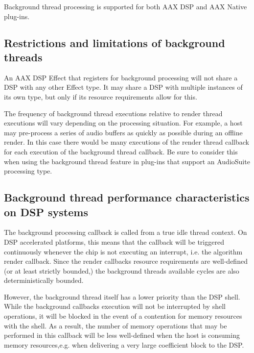 Background thread processing is supported for both A\+AX D\+SP and A\+AX Native plug-\/ins.\hypertarget{a00811_alg_bg_restrict}{}\subsection{Restrictions and limitations of background threads}\label{a00811_alg_bg_restrict}
\begin{DoxyItemize}
\item An A\+AX D\+SP Effect that registers for background processing will not share a D\+SP with any other Effect type. It may share a D\+SP with multiple instances of its own type, but only if its resource requirements allow for this. \item The frequency of background thread executions relative to render thread executions will vary depending on the processing situation. For example, a host may pre-\/process a series of audio buffers as quickly as possible during an offline render. In this case there would be many executions of the render thread callback for each execution of the background thread callback. Be sure to consider this when using the background thread feature in plug-\/ins that support an Audio\+Suite processing type.\end{DoxyItemize}
\hypertarget{a00811_alg_bg_perf}{}\subsection{Background thread performance characteristics on D\+S\+P systems}\label{a00811_alg_bg_perf}
The background processing callback is called from a true idle thread context. On D\+SP accelerated platforms, this means that the callback will be triggered continuously whenever the chip is not executing an interrupt, i.\+e. the algorithm render callback. Since the render callback\textquotesingle{}s resource requirements are well-\/defined (or at least strictly bounded,) the background thread\textquotesingle{}s available cycles are also deterministically bounded.

However, the background thread itself has a lower priority than the D\+SP shell. While the background callback\textquotesingle{}s execution will not be interrupted by shell operations, it will be blocked in the event of a contention for memory resources with the shell. As a result, the number of memory operations that may be performed in this callback will be less well-\/defined when the host is consuming memory resources,e.\+g. when delivering a very large coefficient block to the D\+SP.


